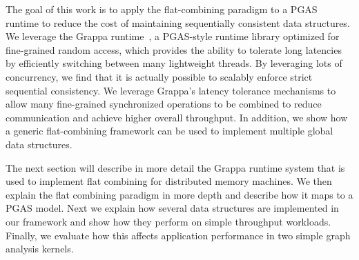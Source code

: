 
The goal of this work is to apply the flat-combining paradigm to a PGAS runtime to reduce the cost of maintaining sequentially consistent data structures.
We leverage the Grappa runtime~\cite{Nelson:hotpar11-real}, a PGAS-style runtime library optimized for fine-grained random access, which provides the ability to tolerate long latencies by efficiently switching between many lightweight threads.
By leveraging lots of concurrency, we find that it is actually possible to scalably enforce strict sequential consistency. We leverage Grappa's latency tolerance mechanisms to allow many fine-grained synchronized operations to be combined to reduce communication and achieve higher overall throughput.
In addition, we show how a generic flat-combining framework can be used to implement multiple global data structures.

The next section will describe in more detail the Grappa runtime system that is used to implement flat combining for distributed memory machines. We then explain the flat combining paradigm in more depth and describe how it maps to a PGAS model. Next we explain how several data structures are implemented in our framework and show how they perform on simple throughput workloads. Finally, we evaluate how this affects application performance in two simple graph analysis kernels.

